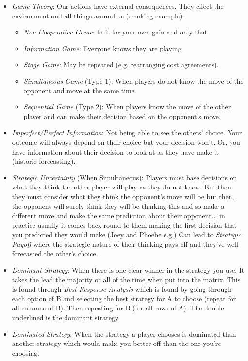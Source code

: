 \documentclass[11pt, english]{article}
\begin{document}
\begin{itemize}
\begin{itemize}
		\end{itemize}
		\item \textit{Game Theory}: Our actions have external consequences. They effect the environment and all things around us (smoking example).
		\begin{itemize}
			\item \textit{Non-Cooperative Game}: In it for your own gain and only that.
			\item \textit{Information Game}: Everyone knows they are playing.
			\item \textit{Stage Game}: May be repeated (e.g. rearranging cost agreements).
			\item \textit{Simultaneous Game} (Type 1): When players do not know the move of the opponent and move at the same time.
			\item \textit{Sequential Game} (Type 2): When players know the move of the other player and can make their decision based on the opponent's move. 
		\end{itemize}
		\item \textit{Imperfect/Perfect Information}: Not being able to see the others' choice. Your outcome will always depend on their choice but your decision won't. Or, you have information about their decision to look at as they have make it (historic forecasting).
		\item \textit{Strategic Uncertainty} (When Simultaneous): Players must base decisions on what they think the other player will play as they do not know. But then they must consider what they think the opponent's move will be but then, the opponent will surely think they will be thinking this and so make a different move and make the same prediction about their opponent... in practice usually it comes back round to them making the first decision that you predicted they would make (Joey and Phoebe e.g.) Can lead to \textit{Strategic Payoff} where the strategic nature of their thinking pays off and they've well forecasted the other's choice.
		\item \textit{Dominant Strategy}: When there is one clear winner in the strategy you use. It takes the lead the majority or all of the time when put into the matrix. This is found through \textit{Best Response Analysis} which is found by going through each option of B and selecting the best strategy for A to choose (repeat for all columns of B). Then repeating for B (for all rows of A). The double underlined is the dominant strategy.
		\item \textit{Dominated Strategy}: When the strategy a player chooses is dominated than another strategy which would make you better-off than the one you're choosing.

\end{itemize}
\end{document}
